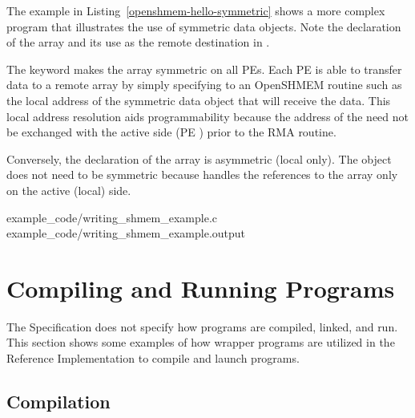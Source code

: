 \clearpage %

The example in Listing~\ref{openshmem-hello-symmetric} shows a more complex
\openshmem program that illustrates the use of symmetric data objects.
Note the declaration of the  array and its use as the
remote destination in \hyperref[subsec:shmem_put]{}.

The  keyword makes the  array symmetric on all \acp{PE}.
Each \ac{PE} is able to transfer data to a remote \dest{} array by simply
specifying to an OpenSHMEM routine such as \hyperref[subsec:shmem_put]{}
the local address of the symmetric data object that will receive the data.
This local address resolution aids programmability because the address of the
\dest{} need not be exchanged with the active side (\ac{PE} ) prior to
the \acf{RMA} routine.

Conversely, the declaration of the  array is asymmetric
(local only).
The \source{} object does not need to be symmetric because \PUT{} handles the
references to the  array only on the active (local) side.

\begin{minipage}{\linewidth}
\vspace{0.1in}
                {example_code/writing_shmem_example.c}
                {example_code/writing_shmem_example.output}
\vspace{0.1in}
\end{minipage}




\chapter{Compiling and Running Programs}\label{sec:compiling}
The \openshmem Specification does not specify how
\openshmem programs are compiled, linked, and run. This section shows some
examples of how wrapper programs are utilized in the \openshmem Reference
Implementation to compile and launch programs.

\section{Compilation}
